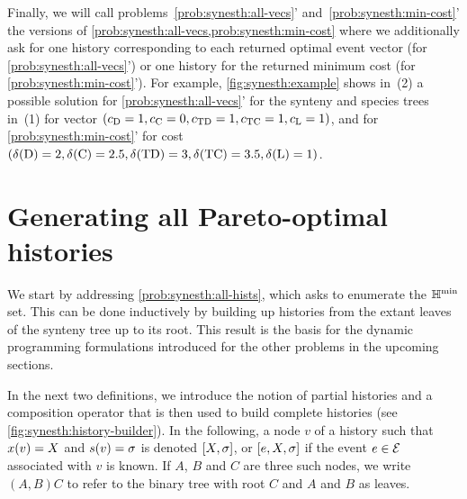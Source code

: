 Finally, we will call problems~\ref*{prob:synesth:all-vecs}' and~\ref*{prob:synesth:min-cost}' the versions of \cref{prob:synesth:all-vecs,prob:synesth:min-cost} where we additionally ask for one history corresponding to each returned optimal event vector (for \cref*{prob:synesth:all-vecs}') or one history for the returned minimum cost (for \cref*{prob:synesth:min-cost}').
For example, \cref{fig:synesth:example} shows in~(2) a possible solution for \cref*{prob:synesth:all-vecs}' for the synteny and species trees in~(1) for vector \((c_{\mathrm{D}} = 1, c_{\mathrm{C}} = 0, c_{\mathrm{TD}} = 1, c_{\mathrm{TC}} = 1, c_{\mathrm{L}} = 1)\), and for \cref*{prob:synesth:min-cost}' for cost \((\delta\kern.1pt(\mathrm{D}) = 2, \delta\kern.1pt(\mathrm{C}) = 2.5, \delta\kern.1pt(\mathrm{TD}) = 3, \delta\kern.1pt(\mathrm{TC}) = 3.5, \delta\kern.1pt(\mathrm{L}) = 1)\).

\section{Generating all Pareto-optimal histories}\label{sec:synesth:pareto-histories}

We start by addressing \cref{prob:synesth:all-hists}, which asks to enumerate the \(\mathbb{H}^{\mathrm{min}}\) set.
This can be done inductively by building up histories from the extant leaves of the synteny tree up to its root.
This result is the basis for the dynamic programming formulations introduced for the other problems in the upcoming sections.

In the next two definitions, we introduce the notion of partial histories and a composition operator that is then used to build complete histories (see \cref{fig:synesth:history-builder}).
In the following, a node \(v\) of a history such that \(x(v) = X\) and \(s(v) = \sigma\) is denoted \([X, \sigma]\), or \([e, X, \sigma]\) if the event \(e \in \mathcal{E}\) associated with \(v\) is known.
If \(A\), \(B\) and \(C\) are three such nodes, we write \((A, B)C\) to refer to the binary tree with root \(C\) and \(A\) and \(B\) as leaves.

